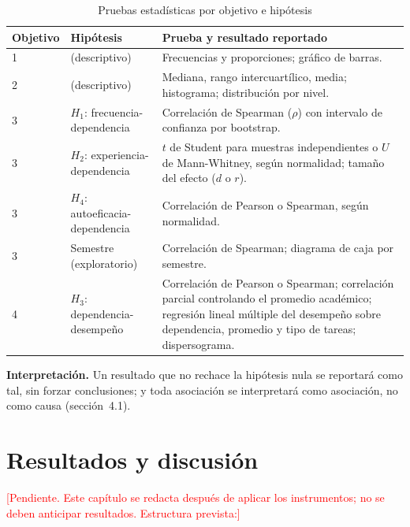 \documentclass[12pt,letterpaper]{article}
\numberwithin{table}{section}
\numberwithin{figure}{section}
\newcommand{\pendiente}[1]{\textcolor{red}{[#1]}}
\begin{document}
\begin{table}[ht]
\centering
\caption{Pruebas estadísticas por objetivo e hipótesis}
\label{tab:pruebas_estadisticas}
\footnotesize
\begin{tabular}{@{}p{1.4cm}p{3.4cm}p{7.4cm}@{}}
\toprule
\textbf{Objetivo} & \textbf{Hipótesis} & \textbf{Prueba y resultado reportado} \\
\midrule
1 & (descriptivo) & Frecuencias y proporciones; gráfico de barras. \\
2 & (descriptivo) & Mediana, rango intercuartílico, media; histograma; distribución por nivel. \\
3 & $H_1$: frecuencia-dependencia & Correlación de Spearman ($\rho$) con intervalo de confianza por bootstrap. \\
3 & $H_2$: experiencia-dependencia & $t$ de Student para muestras independientes o $U$ de Mann-Whitney, según normalidad; tamaño del efecto ($d$ o $r$). \\
3 & $H_4$: autoeficacia-dependencia & Correlación de Pearson o Spearman, según normalidad. \\
3 & Semestre (exploratorio) & Correlación de Spearman; diagrama de caja por semestre. \\
4 & $H_3$: dependencia-desempeño & Correlación de Pearson o Spearman; correlación parcial controlando el promedio académico; regresión lineal múltiple del desempeño sobre dependencia, promedio y tipo de tareas; dispersograma. \\
\bottomrule
\end{tabular}
\end{table}

\textbf{Interpretación.} Un resultado que no rechace la hipótesis nula se reportará como tal, sin forzar conclusiones; y toda asociación se interpretará como asociación, no como causa (sección~4.1).

\section{Resultados y discusión}

\pendiente{Pendiente. Este capítulo se redacta después de aplicar los instrumentos; no se deben anticipar resultados. Estructura prevista:}
\end{document}
